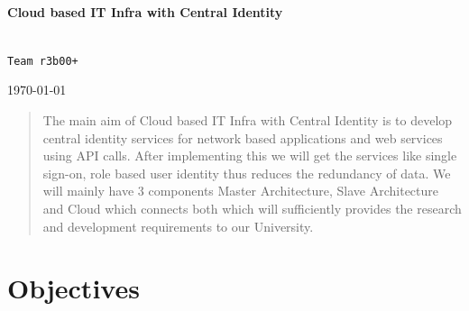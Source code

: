 \documentclass[]{article}
\begin{document}
\begin{titlepage}
\begin{center}
\Large
\textbf{ \\ Cloud based IT Infra with Central Identity \\}

\normalsize
\texttt{ \\ Team r3b00+ \\ }

\vfill
\today

\end{center}


\end{titlepage}



\pagebreak

\setcounter{page}{1}
\begin{abstract}
The main aim of Cloud based IT Infra with Central Identity is to develop central identity services for network based applications and web services using API calls. After implementing this we will get the services like single sign-on, role based user identity thus reduces the redundancy of data. We will mainly have 3 components Master Architecture, Slave Architecture and Cloud which connects both which will sufficiently provides the research and development requirements to our University. 
\end{abstract}

\pagebreak

\tableofcontents

\pagebreak
\setcounter{page}{1}
\section{Objectives}
\end{document}
